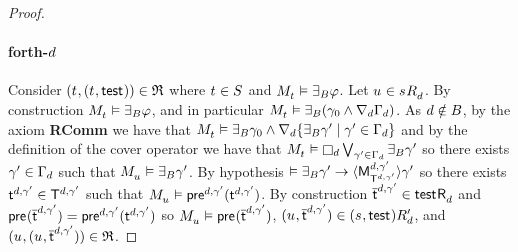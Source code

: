 \begin{proof}
\paragraph{forth-$\agentD$}
Consider $(\kStateT, (\kStateT, \aStateTest)) \in \refinement$ where $\kStateT \in \kStates$ and $\kPModel{\kStateT} \entails \someactsBs \phi$.
Let $\kStateU \in \kSuccessorsD{\kStateS}$.
By construction $\kPModel{\kStateT} \entails \someactsBs \phi$, and in particular $\kPModel{\kStateT} \entails \someactsBs (\gamma_0 \land \coversD \Gamma_\agentD)$.
As $\agentD \notin \agentsB$, by the \axiomAamlS{} axiom {\bf RComm} we have that $\kPModel{\kStateT} \entails \someactsBs \gamma_0 \land \coversD \{\someactsBs \gamma' \mid \gamma' \in \Gamma_\agentD\}$ and by the definition of the cover operator we have that $\kPModel{\kStateT} \entails \necessaryD \bigvee_{\gamma' \in \Gamma_\agentD} \someactsBs \gamma'$ so there exists $\gamma' \in \Gamma_\agentD$ such that $\kPModel{\kStateU} \entails \someactsBs \gamma'$.
By hypothesis $\entails \someactsBs \gamma' \implies \actionE{\aPModel[\agentD, \gamma']{\aStatesT[\agentD, \gamma']}} \gamma'$ so there exists $\aStateT[\agentD, \gamma'] \in \aStatesT[\agentD, \gamma']$ such that $\kPModel{\kStateU} \entails \aPrecondition[\agentD, \gamma'](\aStateT[\agentD, \gamma'])$.
By construction $\aPStateT[\agentD, \gamma'] \in \aSuccessorsD{\aStateTest}$ and $\aPrecondition(\aPStateT[\agentD, \gamma']) = \aPrecondition[\agentD, \gamma'](\aStateT[\agentD, \gamma'])$ so $\kPModel{\kStateU} \entails \aPrecondition(\aPStateT[\agentD, \gamma'])$, $(\kStateU, \aPStateT[\agentD, \gamma']) \in \kSuccessorsPD{(\kStateS, \aStateTest)}$, and $(\kStateU, (\kStateU, \aPStateT[\agentD, \gamma'])) \in \refinement$.


\end{proof}
